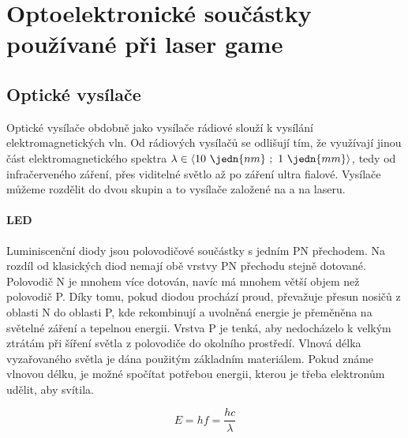 \chapter{Optoelektronické součástky používané při laser game}

\section{Optické vysílače}
Optické vysílače obdobně jako vysílače rádiové slouží k vysílání elektromagnetických vln. Od rádiových vysílačů  se odlišují tím, že využívají jinou část elektromagnetického spektra $\lambda \in \langle 10~\jedn{nm}~;~1~\jedn{mm}  \rangle$, tedy od infračerveného záření, přes viditelné světlo až po záření ultra fialové. Vysílače můžeme rozdělit do dvou skupin a to vysílače založené na  a na laseru.

\subsubsection{LED}
Luminiscenční diody jsou polovodičové součástky s jedním PN přechodem. Na rozdíl od klasických diod nemají  obě vrstvy PN přechodu stejně dotované. Polovodič N je mnohem více dotován, navíc má mnohem větší objem než polovodič P. Díky tomu, pokud diodou prochází proud, převažuje přesun nosičů z oblasti N do oblasti P, kde rekombinují a uvolněná energie je přeměněna na světelné záření a tepelnou energii. Vrstva P je tenká, aby nedocházelo k velkým ztrátám při šíření světla z polovodiče do okolního prostředí. Vlnová délka vyzařovaného světla je dána použitým základním materiálem. Pokud známe vlnovou délku, je možné spočítat potřebou energii, kterou je třeba elektronům udělit, aby  svítila.

$$ E = hf = \dfrac{hc}{\lambda} $$

